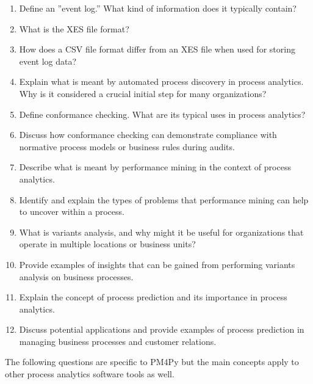 \begin{enumerate}[nosep]
    \item Define an ''event log.'' What kind of information does it typically contain?
    \item What is the XES file format?
    \item How does a CSV file format differ from an XES file when used for storing event log data?
    \item Explain what is meant by automated process discovery in process analytics. Why is it considered a crucial initial step for many organizations?
    \item Define conformance checking. What are its typical uses in process analytics?
    \item Discuss how conformance checking can demonstrate compliance with normative process models or business rules during audits.
    \item Describe what is meant by performance mining in the context of process analytics.
    \item Identify and explain the types of problems that performance mining can help to uncover within a process.
    \item What is variants analysis, and why might it be useful for organizations that operate in multiple locations or business units?
    \item Provide examples of insights that can be gained from performing variants analysis on business processes.
    \item Explain the concept of process prediction and its importance in process analytics.
    \item Discuss potential applications and provide examples of process prediction in managing business processes and customer relations.
\end{enumerate}

The following questions are specific to PM4Py but the main concepts apply to other process analytics software tools as well.


